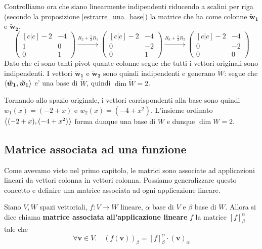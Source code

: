 \begin{solution}
\begin{enumerate}
        Controlliamo ora che siano linearmente indipendenti riducendo a scalini per riga (secondo la proposizione \ref{estrarre_una_base}) la matrice che ha come colonne $\bm{\tilde{w}_1}$ e $\bm{\tilde{w}_2}$.
        \begin{equation*}
            \begin{pmatrix}[c|c]
                -2 & -4 \\ 1 & 0 \\ 0 & 1
            \end{pmatrix} \xrightarrow[]{R_2 + \frac12R_1}
            \begin{pmatrix}[c|c]
                -2 & -4 \\ 0 & -2 \\ 0 & 1
            \end{pmatrix} \xrightarrow[]{R_3 + \frac12R_2}
            \begin{pmatrix}[c|c]
                -2 & -4 \\ 0 & -2 \\ 0 & 0
            \end{pmatrix}
        \end{equation*}
        Dato che ci sono tanti pivot quante colonne segue che tutti i vettori originali sono indipendenti.
        I vettori $\bm{\tilde{w}_1}$ e $\bm{\tilde{w}_2}$ sono quindi indipendenti e generano $\widetilde{W}$: segue che $\left\langle \bm{\tilde{w}_1}, \bm{\tilde{w}_1} \right\rangle$ e' una base di $\widetilde{W}$, quindi $\dim \widetilde{W} = 2$.

        Tornando allo spazio originale, i vettori corrispondenti alla base sono quindi $w_1(x) = (-2 + x)$ e $w_2(x) = (-4 + x^2)$. L'insieme ordinato $\left\langle (-2+x), (-4+x^2) \right\rangle$ forma dunque una base di $W$ e dunque $\dim W = 2$.
    \end{enumerate}
\end{solution}

\subsection{Matrice associata ad una funzione}

Come avevamo visto nel primo capitolo, le matrici sono associate ad applicazioni lineari da vettori colonna in vettori colonna. Possiamo generalizzare questo concetto e definire una matrice associata ad ogni applicazione lineare.

\begin{definition}
    Siano $V, W$ spazi vettoriali, $f : V \to W$ lineare, $\alpha$ base di $V$ e $\beta$ base di $W$. Allora si dice chiama \textbf{matrice associata all'applicazione lineare} $f$ la matrice $[f]^{\alpha}_{\beta}$ tale che
    \begin{equation}
        \forall \bm{v} \in V. \quad \left( f(\bm{v}) \right)_{\beta} = [f]^{\alpha}_{\beta} \cdot (\bm{v})_{\alpha}
    \end{equation}
\end{definition}
